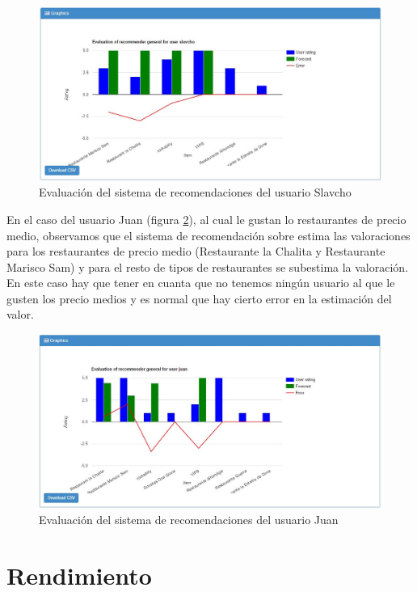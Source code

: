 \begin{figure}[H]
	\centering\includegraphics[scale=0.45]{imagenes/explotacion/simulacion/errores-slavcho.jpg}
	\caption{Evaluación del sistema de recomendaciones del usuario Slavcho}
	\label{evaluarSlavcho}
\end{figure}

En el caso del usuario Juan (figura \ref{evaluarJuan}), al cual le gustan lo restaurantes de precio medio, observamos que el sistema de recomendación sobre estima las valoraciones para los restaurantes de precio medio (Restaurante la Chalita y Restaurante Marisco Sam) y para el resto de tipos de restaurantes se subestima la valoración. En este caso hay que tener en cuanta que no tenemos ningún usuario al que le gusten los precio medios y es normal que hay cierto error en la estimación del valor.

\begin{figure}[H]
	\centering\includegraphics[scale=0.45]{imagenes/explotacion/simulacion/errores-juan.jpg}
	\caption{Evaluación del sistema de recomendaciones del usuario Juan}
	\label{evaluarJuan}
\end{figure} 

\section{Rendimiento}

